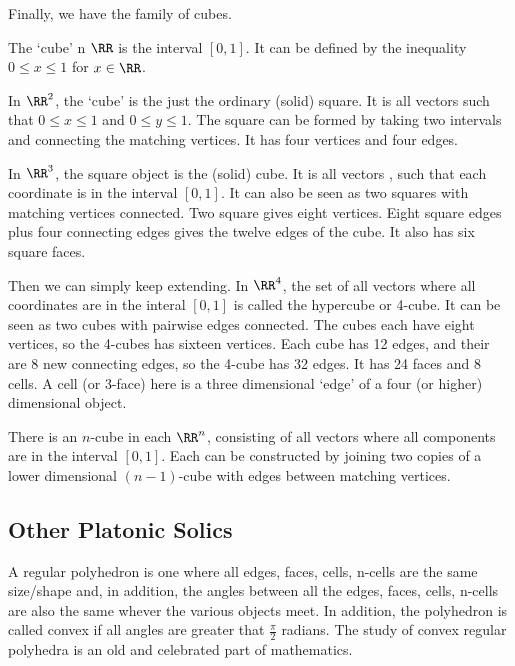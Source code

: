 \documentclass[fleqn]{report}
\begin{document}
Finally, we have the family of cubes.
\begin{smallitemize}
\item The `cube' n $\RR$ is the interval $[0,1]$. It
can be defined by the inequality $0 \leq x \leq 1$ for $x \in
\RR$. 
\item In $\RR^2$, the `cube' is the just the ordinary
(solid) square. It is all vectors
 such that $0 \leq x \leq 1$
and $0 \leq y \leq 1$. The square can be formed by taking two
intervals and connecting the matching vertices. It has four
vertices and four edges.
\item In $\RR^3$, the square object is the (solid) cube. It is
all vectors , such that
each coordinate is in the interval $[0,1]$. It can also be
seen as two squares with matching vertices connected. Two
square gives eight vertices. Eight square edges plus four
connecting edges gives the twelve edges of the cube. It also
has six square faces. 
\item Then we can simply keep extending. In $\RR^4$, the set of all
vectors  where all
coordinates are in the interal $[0,1]$ is called the hypercube
or 4-cube. It can be seen as two cubes with pairwise edges
connected. The cubes each have eight vertices, so the 4-cubes
has sixteen vertices. Each cube has 12 edges, and their are 8
new connecting edges, so the 4-cube has 32 edges. It has 24
faces and 8 cells. A cell (or 3-face) here is a three
dimensional `edge' of a four (or higher) dimensional object. 
\item There is an $n$-cube in each $\RR^n$, consisting of all
vectors where all components are in the interval $[0,1]$. Each
can be constructed by joining two copies of a lower
dimensional $(n-1)$-cube with edges between matching vertices.
\end{smallitemize}

\subsection{Other Platonic Solics}
\label{other-solids}

A regular polyhedron is one where all edges, faces, cells,
n-cells are the same size/shape and, in addition, the angles
between all the edges, faces, cells, n-cells are also the same
whever the various objects meet. In addition, the polyhedron
is called convex if all angles are greater that
$\frac{\pi}{2}$ radians. The study of convex regular polyhedra
is an old and celebrated part of mathematics. 
\end{document}
